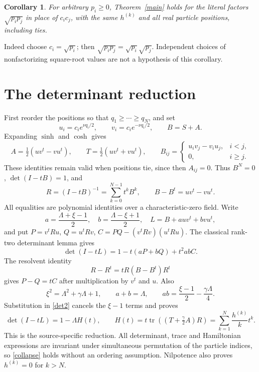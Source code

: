\documentclass[11pt]{article}
\newtheorem{corollary}{Corollary}
\begin{document}
\begin{corollary}\label{positive}
For arbitrary $p_i\geq0$, Theorem~\ref{main} holds for the literal factors $\sqrt{p_ip_j}$ in place of $c_ic_j$, with the same $h^{(k)}$ and all real particle positions, including ties.
\end{corollary}
Indeed choose $c_i=\sqrt{p_i}$; then $\sqrt{p_ip_j}=\sqrt{p_i}\sqrt{p_j}$. Independent choices of nonfactorizing square-root values are not a hypothesis of this corollary.

\section*{The determinant reduction}
First reorder the positions so that $q_1\geq\cdots\geq q_N$, and set
\[
 u_i=c_i e^{\nu q_i/2},\qquad v_i=c_i e^{-\nu q_i/2},\qquad B=S+A.
\]
Expanding $\sinh$ and $\cosh$ gives
\[
 A=\tfrac12(uv^t-vu^t),\qquad T=\tfrac12(uv^t+vu^t),\qquad
 B_{ij}=\begin{cases}u_iv_j-v_iu_j,&i<j,\\0,&i\geq j.\end{cases}
\]
These identities remain valid when positions tie, since then $A_{ij}=0$. Thus $B^N=0$, $\det(I-tB)=1$, and
\[
 R=(I-tB)^{-1}=\sum_{k=0}^{N-1}t^kB^k,\qquad B-B^t=uv^t-vu^t.
\]
All equalities are polynomial identities over a characteristic-zero field. Write
\[
 a=\frac{\Lambda+\xi-1}{2},\quad b=\frac{\Lambda-\xi+1}{2},\quad
 L=B+a uv^t+bvu^t,
\]
and put $P=v^tRu$, $Q=u^tRv$, $C=PQ-(v^tRv)(u^tRu)$. The classical rank-two determinant lemma gives
\begin{equation}\label{det2}
 \det(I-tL)=1-t(aP+bQ)+t^2abC.
\end{equation}
The resolvent identity
\[
 R-R^t=tR(B-B^t)R^t
\]
gives $P-Q=tC$ after multiplication by $v^t$ and $u$. Also
\[
 \xi^2=\Lambda^2+\gamma\Lambda+1,\qquad a+b=\Lambda,\qquad
 ab=\frac{\xi-1}{2}-\frac{\gamma\Lambda}{4}.
\]
Substitution in \eqref{det2} cancels the $\xi-1$ terms and proves
\begin{equation}\label{collapse}
 \det(I-tL)=1-\Lambda H(t),\qquad
 H(t)=t\operatorname{tr}\left((T+\tfrac\gamma2 A)R\right)
      =\sum_{k=1}^N\frac{h^{(k)}}k t^k.
\end{equation}
This is the source-specific reduction. All determinant, trace and Hamiltonian expressions are invariant under simultaneous permutation of the particle indices, so \eqref{collapse} holds without an ordering assumption. Nilpotence also proves $h^{(k)}=0$ for $k>N$.
\end{document}

